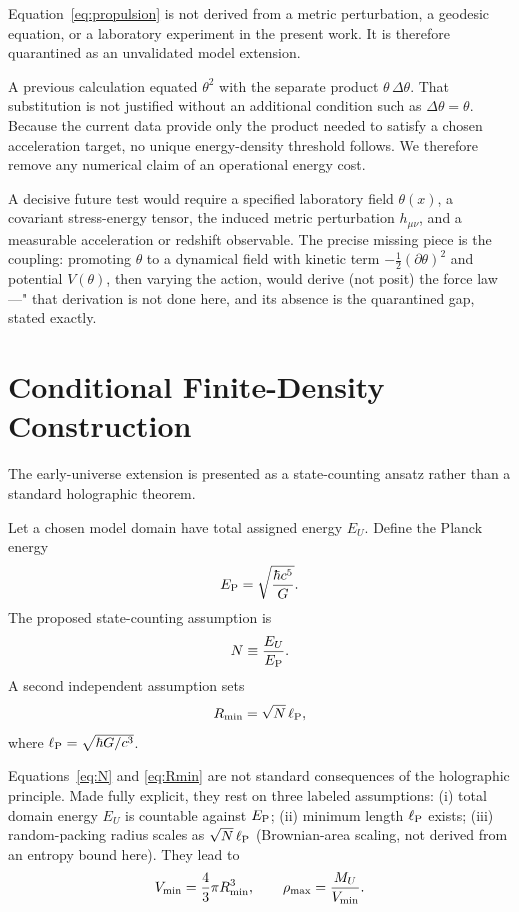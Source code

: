 \documentclass[twocolumn]{aastex631}
\begin{document}
Equation~\eqref{eq:propulsion} is not derived from a metric perturbation, a geodesic equation, or a laboratory experiment in the present work. It is therefore quarantined as an unvalidated model extension.

A previous calculation equated $\theta^2$ with the separate product $\theta\,\Delta\theta$. That substitution is not justified without an additional condition such as $\Delta\theta=\theta$. Because the current data provide only the product needed to satisfy a chosen acceleration target, no unique energy-density threshold follows. We therefore remove any numerical claim of an operational energy cost.

A decisive future test would require a specified laboratory field $\theta(x)$, a covariant stress-energy tensor, the induced metric perturbation $h_{\mu\nu}$, and a measurable acceleration or redshift observable. The precise missing piece is the coupling: promoting $\theta$ to a dynamical field with kinetic term $-\frac12(\partial\theta)^2$ and potential $V(\theta)$, then varying the action, would derive (not posit) the force law ---" that derivation is not done here, and its absence is the quarantined gap, stated exactly.

\section{Conditional Finite-Density Construction}
The early-universe extension is presented as a state-counting ansatz rather than a standard holographic theorem.

Let a chosen model domain have total assigned energy $E_U$. Define the Planck energy
\[
E_{\rm P}=\sqrt{\frac{\hbar c^5}{G}}.
\]
The proposed state-counting assumption is
\begin{equation}
N\equiv\frac{E_U}{E_{\rm P}}.
\label{eq:N}
\end{equation}
A second independent assumption sets
\begin{equation}
R_{\rm min}=\sqrt N\,\ell_{\rm P},
\label{eq:Rmin}
\end{equation}
where $\ell_{\rm P}=\sqrt{\hbar G/c^3}$.

Equations~\eqref{eq:N} and \eqref{eq:Rmin} are not standard consequences of the holographic principle. Made fully explicit, they rest on three labeled assumptions: (i) total domain energy $E_U$ is countable against $E_{\rm P}$; (ii) minimum length $\ell_{\rm P}$ exists; (iii) random-packing radius scales as $\sqrt N\,\ell_{\rm P}$ (Brownian-area scaling, not derived from an entropy bound here). They lead to
\begin{equation}
V_{\rm min}=\frac43\pi R_{\rm min}^3,
\qquad
\rho_{\rm max}=\frac{M_U}{V_{\rm min}}.
\label{eq:rhomax}
\end{equation}
\end{document}
